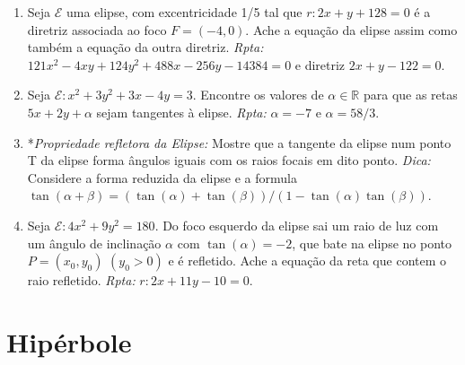 \documentclass{article}
\begin{document}
\begin{enumerate}
\begin{enumerate}
       {\it Rpta: } não, $r$ é uma reta secante 
       (i.e. corta a elipse em dois pontos)
       \item A reta $r: 2x+y=10$ é tangente à elipse 
       $\mathcal{E}:4x^2+9y^2=36$? 
       {\it Rpta: } não, 
       $r$ não intercepta a elipse.
       \end{enumerate}
    \item  Seja $\mathcal{E}$ uma elipse, com excentricidade 1/5 tal que
    $r: 2x+y+128=0$ é a diretriz associada ao foco $F=(-4,0)$. 
    Ache a equação da elipse assim como também a equação da outra diretriz.
    {\it Rpta: } $121x^2 -4xy +124y^2 +488x-256y-14384=0$ e
    diretriz  $2x+y-122=0$.
    \item Seja $\mathcal{E}: x^2+3y^2 +3x-4y=3$. 
    Encontre os valores de $\alpha \in \mathbb{R}$ 
    para que as retas $5x+2y+\alpha$ sejam tangentes à elipse. 
    {\it Rpta: } $\alpha=-7$ e $\alpha=58/3$.
    \item *{\it Propriedade refletora da Elipse: } Mostre que a tangente da elipse num ponto T da elipse forma ângulos iguais com os raios focais em dito ponto. 
    {\it Dica: } 
    Considere a forma reduzida da elipse e 
    a formula $\tan(\alpha+\beta)=(\tan(\alpha)+\tan(\beta))/(1-\tan(\alpha)\tan(\beta))$.  
    \item Seja $\mathcal{E}: 4x^2+9y^2=180$. 
    Do foco esquerdo da elipse sai um raio de luz 
    com um ângulo de inclinação $\alpha$ com $\tan(\alpha)=-2$, 
     que bate na elipse no ponto $P=(x_0,y_0)$ $(y_0>0)$ e 
     é refletido. Ache a equação da reta que contem o raio refletido. 
     {\it Rpta: } $r: 2x+11y-10=0$.  
    \end{enumerate}

\section*{Hipérbole} 
 
\end{document}
